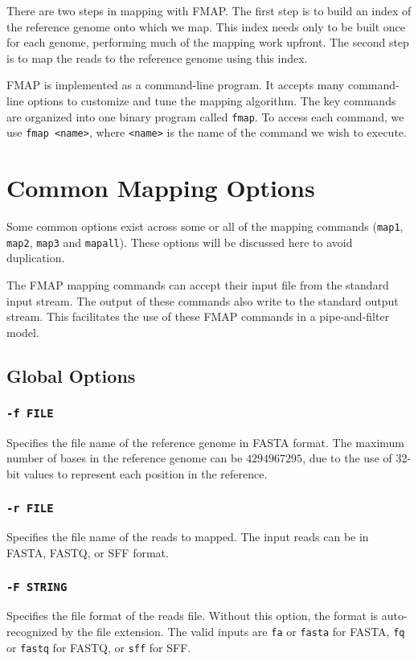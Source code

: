 \documentclass[a4paper,12pt]{book}
\newcommand{\TT}[1]{{\tt #1}} %
\begin{document}
There are two steps in mapping with FMAP.
The first step is to build an index of the reference genome onto which we map.
This index needs only to be built once for each genome, performing much of the mapping work upfront.
The second step is to map the reads to the reference genome using this index.

FMAP is implemented as a command-line program.
It accepts many command-line options to customize and tune the mapping algorithm.
The key commands are organized into one binary program called \TT{fmap}.
To access each command, we use \TT{fmap <name>}, where \TT{<name>} is the name of the command we wish to execute.

\section{Common Mapping Options}
\label{sec:commonoptions}
Some common options exist across some or all of the mapping commands (\TT{map1}, \TT{map2}, \TT{map3} and \TT{mapall}). 
These options will be discussed here to avoid duplication.

The FMAP mapping commands can accept their input file from the standard input stream.
The output of these commands also write to the standard output stream.
This facilitates the use of these FMAP commands in a pipe-and-filter model.

\subsection{Global Options}
\subsubsection{\TT{-f FILE}}
Specifies the file name of the reference genome in FASTA format.
The maximum number of bases in the reference genome can be $4294967295$, due to the use of 32-bit values to represent each position in the reference.

\subsubsection{\TT{-r FILE}}
Specifies the file name of the reads to mapped.
The input reads can be in FASTA, FASTQ, or SFF format.

\subsubsection{\TT{-F STRING}}
Specifies the file format of the reads file.
Without this option, the format is auto-recognized by the file extension.
The valid inputs are \TT{fa} or \TT{fasta} for FASTA, \TT {fq} or \TT{fastq} for FASTQ, or \TT{sff} for SFF.
\end{document}
